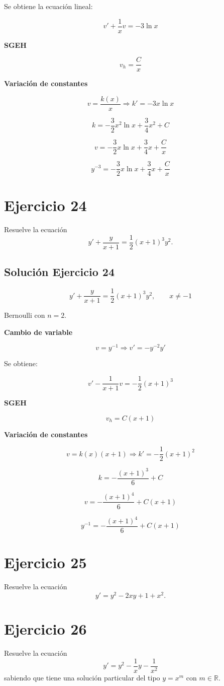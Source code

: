 \documentclass[12pt]{article}
\begin{document}
Se obtiene la ecuación lineal:

\[
v' + \frac{1}{x}v = -3\ln x
\]

\textbf{SGEH}

\[
v_h = \frac{C}{x}
\]

\textbf{Variación de constantes}

\[
v = \frac{k(x)}{x}
\Rightarrow
k' = -3x\ln x
\]

\[
k = -\frac{3}{2}x^2\ln x + \frac{3}{4}x^2 + C
\]

\[
v = -\frac{3}{2}x\ln x + \frac{3}{4}x + \frac{C}{x}
\]

\[
\boxed{y^{-3} = -\frac{3}{2}x\ln x + \frac{3}{4}x + \frac{C}{x}}
\]

\section*{Ejercicio 24}
Resuelve la ecuación
\[
y' + \dfrac{y}{x + 1} = \dfrac{1}{2}(x + 1)^3 y^2.
\]

\subsection*{Solución Ejercicio 24}

\[
y' + \frac{y}{x+1} = \frac{1}{2}(x+1)^3 y^2,
\qquad x \neq -1
\]

Bernoulli con \(n=2\).

\textbf{Cambio de variable}

\[
v = y^{-1}
\Rightarrow
v' = -y^{-2}y'
\]

Se obtiene:

\[
v' - \frac{1}{x+1}v
= -\frac{1}{2}(x+1)^3
\]

\textbf{SGEH}

\[
v_h = C(x+1)
\]

\textbf{Variación de constantes}

\[
v = k(x)(x+1)
\Rightarrow
k' = -\frac{1}{2}(x+1)^2
\]

\[
k = -\frac{(x+1)^3}{6} + C
\]

\[
v = -\frac{(x+1)^4}{6} + C(x+1)
\]

\[
\boxed{y^{-1} = -\frac{(x+1)^4}{6} + C(x+1)}
\]

\section*{Ejercicio 25}
Resuelve la ecuación
\[
y' = y^2 - 2xy + 1 + x^2.
\]

\section*{Ejercicio 26}
Resuelve la ecuación
\[
y' = y^2 - \dfrac{1}{x}y - \dfrac{1}{x^2}
\]
sabiendo que tiene una solución particular del tipo $y = x^m$ con $m \in \mathbb{R}$.
\end{document}
